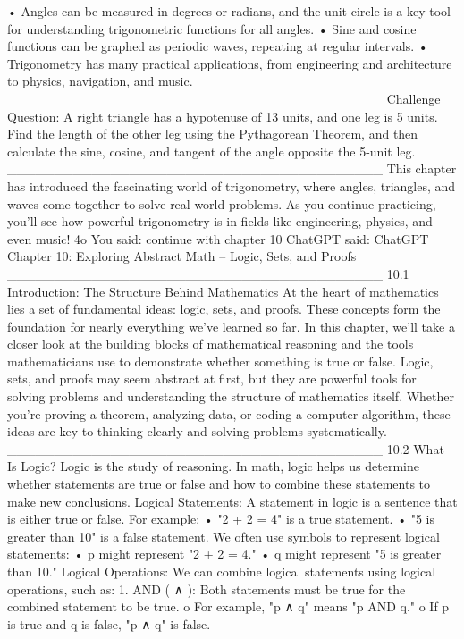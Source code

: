 •	Angles can be measured in degrees or radians, and the unit circle is a key tool for understanding trigonometric functions for all angles.
•	Sine and cosine functions can be graphed as periodic waves, repeating at regular intervals.
•	Trigonometry has many practical applications, from engineering and architecture to physics, navigation, and music.
________________________________________
Challenge Question:
A right triangle has a hypotenuse of 13 units, and one leg is 5 units. Find the length of the other leg using the Pythagorean Theorem, and then calculate the sine, cosine, and tangent of the angle opposite the 5-unit leg.
________________________________________
This chapter has introduced the fascinating world of trigonometry, where angles, triangles, and waves come together to solve real-world problems. As you continue practicing, you'll see how powerful trigonometry is in fields like engineering, physics, and even music!
4o
You said:
continue with chapter 10 
ChatGPT said:
ChatGPT
Chapter 10: Exploring Abstract Math – Logic, Sets, and Proofs
________________________________________
10.1 Introduction: The Structure Behind Mathematics
At the heart of mathematics lies a set of fundamental ideas: logic, sets, and proofs. These concepts form the foundation for nearly everything we’ve learned so far. In this chapter, we’ll take a closer look at the building blocks of mathematical reasoning and the tools mathematicians use to demonstrate whether something is true or false.
Logic, sets, and proofs may seem abstract at first, but they are powerful tools for solving problems and understanding the structure of mathematics itself. Whether you're proving a theorem, analyzing data, or coding a computer algorithm, these ideas are key to thinking clearly and solving problems systematically.
________________________________________
10.2 What Is Logic?
Logic is the study of reasoning. In math, logic helps us determine whether statements are true or false and how to combine these statements to make new conclusions.
Logical Statements:
A statement in logic is a sentence that is either true or false. For example:
•	"2 + 2 = 4" is a true statement.
•	"5 is greater than 10" is a false statement.
We often use symbols to represent logical statements:
•	p might represent "2 + 2 = 4."
•	q might represent "5 is greater than 10."
Logical Operations:
We can combine logical statements using logical operations, such as:
1.	AND ( ∧ ): Both statements must be true for the combined statement to be true.
o	For example, "p ∧ q" means "p AND q."
o	If p is true and q is false, "p ∧ q" is false.
